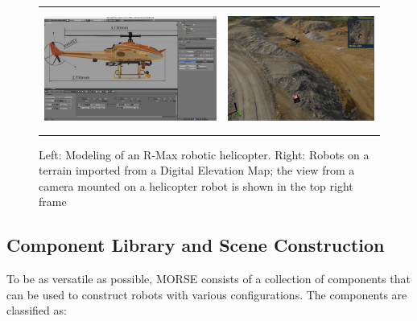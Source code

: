 \documentclass{llncs}
\begin{document}
\begin{figure}[ht!]
\centering
\begin{tabular}{cc}
 \includegraphics[height=1.55in]{pics/MORSE-rmax_mesh.png} &
 \includegraphics[height=1.55in]{pics/MORSE-quarry_ok-1.png}
\end{tabular}
\caption{Left: Modeling of an R-Max robotic helicopter. Right: Robots on a
    terrain imported from a Digital Elevation Map; the view from a camera mounted
    on a helicopter robot is shown in the top right frame}
\label{fig:models}
\end{figure}


\subsection{Component Library and Scene Construction}
\label{section:components}

To be as versatile as possible, MORSE consists of a collection of components
that can be used to construct robots with various configurations. The
components are classified as:
\end{document}
